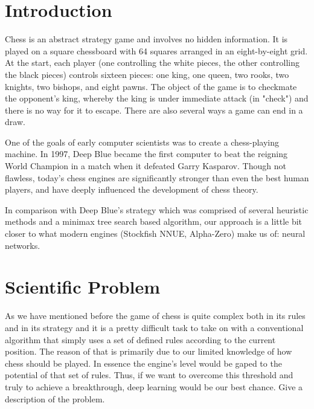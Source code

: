 \documentclass[runningheads,a4paper,11pt]{report}
\begin{document}
\tableofcontents

\newpage

\newpage




\newpage



 


\chapter{Introduction}
\label{chapter:introduction}


Chess is an abstract strategy game and involves no hidden information. It is played on a square chessboard with 64 squares arranged in an eight-by-eight grid. At the start, each player (one controlling the white pieces, the other controlling the black pieces) controls sixteen pieces: one king, one queen, two rooks, two knights, two bishops, and eight pawns. The object of the game is to checkmate the opponent's king, whereby the king is under immediate attack (in "check") and there is no way for it to escape. There are also several ways a game can end in a draw.

One of the goals of early computer scientists was to create a chess-playing machine. In 1997, Deep Blue became the first computer to beat the reigning World Champion in a match when it defeated Garry Kasparov. Though not flawless, today's chess engines are significantly stronger than even the best human players, and have deeply influenced the development of chess theory.

In comparison with Deep Blue's strategy which was comprised of several heuristic methods and a minimax tree search based algorithm, our approach is a little bit closer to what modern engines (Stockfish NNUE, Alpha-Zero) make us of: neural networks.



\chapter{Scientific Problem}
\label{section:scientificProblem}


As we have mentioned before the game of chess is quite complex both in its rules and in its strategy and it is a pretty difficult task to take on with a conventional algorithm that simply uses a set of defined rules according to the current position. The reason of that is primarily due to our limited knowledge of how chess should be played. In essence the engine's level would be gaped to the potential of that set of rules. Thus, if we want to overcome this threshold and truly to achieve a breakthrough, deep learning would be our best chance.
Give a description of the problem.
\end{document}
